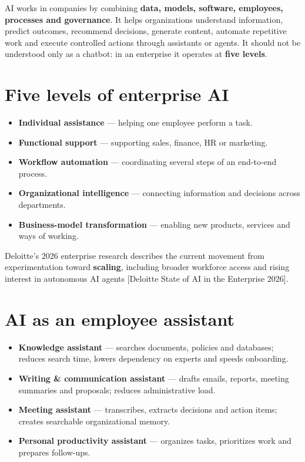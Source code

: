 
AI works in companies by combining \textbf{data, models, software, employees,
processes and governance}. It helps organizations understand information,
predict outcomes, recommend decisions, generate content, automate repetitive
work and execute controlled actions through assistants or agents. It should
not be understood only as a chatbot: in an enterprise it operates at
\textbf{five levels}.

\section{Five levels of enterprise AI}

\begin{itemize}
  \item \textbf{Individual assistance} — helping one employee perform a task.
  \item \textbf{Functional support} — supporting sales, finance, HR or marketing.
  \item \textbf{Workflow automation} — coordinating several steps of an
        end-to-end process.
  \item \textbf{Organizational intelligence} — connecting information and
        decisions across departments.
  \item \textbf{Business-model transformation} — enabling new products,
        services and ways of working.
\end{itemize}

Deloitte's 2026 enterprise research describes the current movement from
experimentation toward \textbf{scaling}, including broader workforce access
and rising interest in autonomous AI agents [Deloitte State of AI in the
Enterprise 2026].

\section{AI as an employee assistant}

\begin{itemize}
  \item \textbf{Knowledge assistant} — searches documents, policies and
        databases; reduces search time, lowers dependency on experts and
        speeds onboarding.
  \item \textbf{Writing \& communication assistant} — drafts emails, reports,
        meeting summaries and proposals; reduces administrative load.
  \item \textbf{Meeting assistant} — transcribes, extracts decisions and
        action items; creates searchable organizational memory.
  \item \textbf{Personal productivity assistant} — organizes tasks,
        prioritizes work and prepares follow-ups.
\end{itemize}

